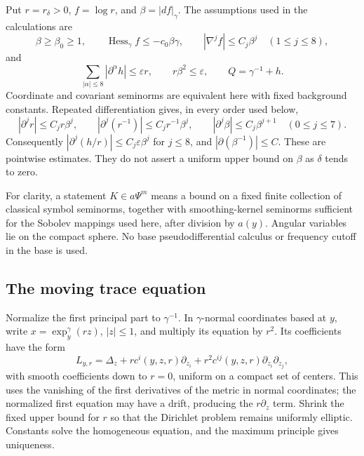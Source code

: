 \documentclass[11pt]{article}
\theoremstyle{definition}
\theoremstyle{remark}
\numberwithin{equation}{section}
\begin{document}
Put $r=r_\delta>0$, $f=\log r$, and $\beta=|df|_\gamma$.  The assumptions
used in the calculations are
\begin{equation}\label{angular-expanded:profile-bounds}
 \beta\geq\beta_0\geq1,\qquad
 \operatorname{Hess}_\gamma f\leq-c_0\beta\gamma,
 \qquad |\nabla^jf|\leq C_j\beta^j\quad(1\leq j\leq8),
\end{equation}
and
\begin{equation}\label{angular-expanded:smallness}
 \sum_{|\alpha|\leq8}|\partial^\alpha h|\leq\varepsilon r,
 \qquad r\beta^2\leq\varepsilon,\qquad Q=\gamma^{-1}+h.
\end{equation}
Coordinate and covariant seminorms are equivalent here with fixed background
constants.  Repeated differentiation gives, in every order used below,
\[
 |\partial^jr|\leq C_jr\beta^j,\qquad
 |\partial^j(r^{-1})|\leq C_jr^{-1}\beta^j,
 \qquad |\partial^j\beta|\leq C_j\beta^{j+1}\quad(0\leq j\leq7).
\]
Consequently $|\partial^j(h/r)|\leq C_j\varepsilon\beta^j$ for $j\leq8$,
and $|\partial(\beta^{-1})|\leq C$.  These are pointwise estimates.  They
do not assert a uniform upper bound on $\beta$ as $\delta$ tends to zero.

For clarity, a statement $K\in a\Psi^m$ means a bound on a fixed finite
collection of classical symbol seminorms, together with smoothing-kernel
seminorms sufficient for the Sobolev mappings used here, after division by
$a(y)$.  Angular variables lie on the compact sphere.  No base
pseudodifferential calculus or frequency cutoff in the base is used.

\subsection{The moving trace equation}
\label{angular-expanded:trace}

Normalize the first principal part to $\gamma^{-1}$.  In $\gamma$-normal
coordinates based at $y$, write $x=\exp_y^\gamma(rz)$, $|z|\leq1$, and
multiply its equation by $r^2$.  Its coefficients have the form
\[
 L_{y,r}=\Delta_z+r c^i(y,z,r)\partial_{z_i}
                  +r^2 c^{ij}(y,z,r)\partial_{z_i}\partial_{z_j},
\]
with smooth coefficients down to $r=0$, uniform on a compact set of centers.
This uses the vanishing of the first derivatives of the metric in normal
coordinates; the normalized first equation may have a drift, producing
the $r\partial_z$ term.  Shrink the fixed upper bound for $r$ so that the
Dirichlet problem remains uniformly elliptic.  Constants solve the
homogeneous equation, and the maximum principle gives uniqueness.
\end{document}
